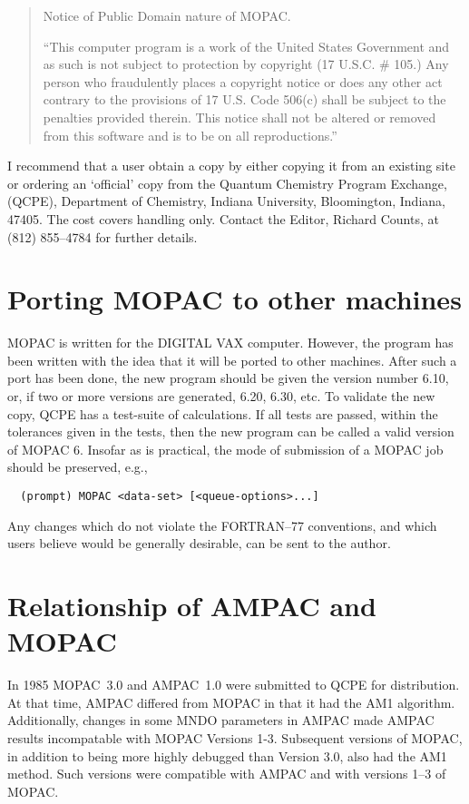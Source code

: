 \documentclass[11pt]{book}
\newcommand{\mi}[1]{#1\index{#1}}
\begin{document}
\begin{quote}
          Notice of Public Domain nature of MOPAC.

         ``This computer program is a work of the United States 
          Government and as such is not subject to protection by 
          copyright (17 U.S.C. \# 105.)  Any person who fraudulently 
          places a copyright notice or does any other act contrary 
          to the provisions of 17 U.S. Code 506(c) shall be subject 
          to the penalties provided therein.  This notice shall not 
          be altered or removed from this software and is to be on 
          all reproductions.''
\end{quote}

   I recommend that a user obtain a  copy  by  either  copying  it  from  an
   existing  site  or ordering an `official' copy from the Quantum Chemistry
   Program Exchange, (QCPE), Department of  Chemistry,  Indiana  University,
   Bloomington, Indiana, 47405.  The cost 
   covers handling only.  Contact the
   Editor, Richard Counts, at (812) 855--4784 for further details.
         
\section{Porting MOPAC to other machines}
 MOPAC is written for the DIGITAL \mi{VAX} computer.  However, the program
 has  been written with the idea that it will be ported to other machines.
 After such a port has been done, the new  program  should  be  given  the
 version  number  6.10,  or,  if two or more versions are generated, 6.20,
 6.30,  etc.   To  validate  the  new  copy,  QCPE  has  a  test-suite  of
 calculations.   If  all  tests are passed, within the tolerances given in
 the tests, then the new program can be called a valid version of MOPAC 6.
 Insofar  as is practical, the mode of submission of a MOPAC job should be
 preserved, e.g.,
\begin{verbatim}   
  (prompt) MOPAC <data-set> [<queue-options>...]
\end{verbatim}
 
      Any changes which do not violate  the FORTRAN--77  conventions,  and
 which  users  believe  would  be  generally desirable, can be sent to the
 author.

\section{Relationship of AMPAC and MOPAC}
   In 1985  MOPAC~3.0  and  AMPAC~1.0  were  submitted  to  QCPE  for
   distribution.  At that time, AMPAC differed from MOPAC in that it had the
   AM1 algorithm.  Additionally, changes in some MNDO  parameters  in  AMPAC
   made  AMPAC  results  incompatable  with  MOPAC Versions 1-3.  Subsequent
   versions of MOPAC, in addition to being more highly debugged than Version
   3.0,  also  had the AM1 method.  Such versions were compatible with AMPAC
   and with versions 1--3 of MOPAC.
\end{document}
